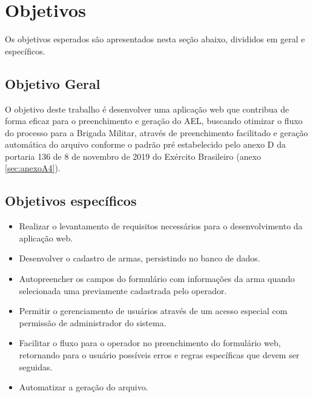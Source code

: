 \section{Objetivos}
Os objetivos esperados são apresentados nesta seção abaixo, divididos em geral e específicos. 

\subsection{Objetivo Geral}
O objetivo deste trabalho é desenvolver uma aplicação web que contribua de forma eficaz para o preenchimento e geração do AEL, buscando otimizar o fluxo do processo para a Brigada Militar, através de preenchimento facilitado e geração automática do arquivo conforme o padrão pré estabelecido pelo anexo D da portaria 136 de 8 de novembro de 2019 do Exército Brasileiro (anexo \ref{sec:anexoA4}).

\subsection{Objetivos específicos}
\begin{itemize}
    \item Realizar o levantamento de requisitos necessários para o desenvolvimento da aplicação web. 
    \item Desenvolver o cadastro de armas, persistindo no banco de dados.
    \item Autopreencher os campos do formulário com informações da arma quando selecionada uma previamente cadastrada pelo operador.
    \item Permitir o gerenciamento de usuários através de um acesso especial com permissão de administrador do sistema.
    \item Facilitar o  fluxo para o operador no preenchimento do formulário web, retornando para o usuário possíveis erros e regras específicas que devem ser seguidas.
    \item Automatizar a geração do arquivo.
\end{itemize}  
